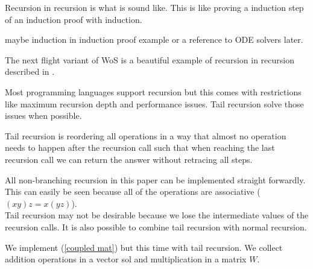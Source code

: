 \documentclass[a4paper,12pt]{article}
\begin{document}
\begin{pythonn} 
\end{pythonn}

\begin{technique}
    Recursion in recursion is what is sound like. This is like proving a induction
    step of an induction proof with induction.
\end{technique}

\begin{example}
    maybe induction in induction proof example or a reference to ODE solvers later.
\end{example}

\begin{related}
    The next flight variant of WoS
    is a beautiful example of recursion in recursion described in
    \cite{sawhney_grid-free_2022}.
\end{related}

Most programming languages support recursion but this comes with restrictions
like maximum recursion depth and performance issues. Tail recursion solve those
issues when possible.

\begin{technique}
    Tail recursion is reordering all operations in a way that
    almost no operation needs to happen after the recursion call such that when reaching
    the last recursion call we can return the answer without retracing all steps.
\end{technique}

All non-branching recursion
in this paper can be implemented straight forwardly. This can easily be seen because
all of the operations are associative ($(xy)z = x(yz)$). \\
Tail recursion may not be desirable because we lose the intermediate values of the
recursion calls. It is also possible to combine tail recursion with normal recursion.

\begin{pythonn}
    We implement (\ref{coupled mat}) but this time with tail recursion.
    We collect addition operations in a vector sol and multiplication
    in a matrix $W$.
    \vspace{0.3cm}
\end{pythonn}
\end{document}
